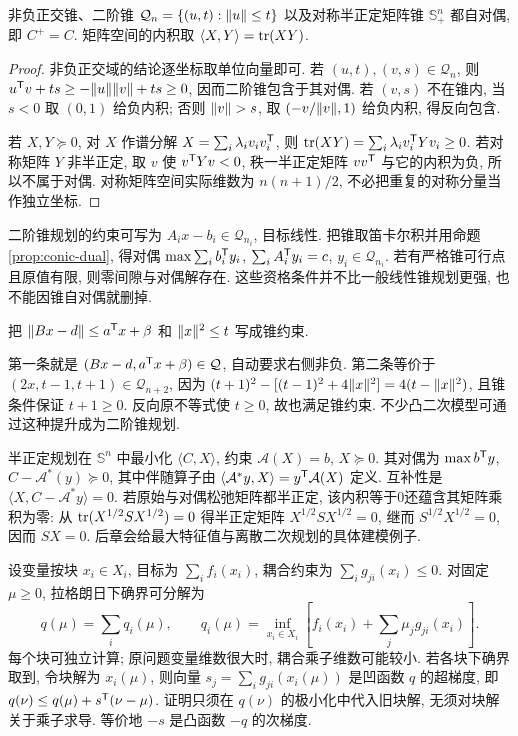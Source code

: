 \begin{proposition}
非负正交锥、二阶锥 $\mathcal Q_n=\{(u,t):\lVert u\rVert\le t\}$ 以及对称半正定矩阵锥 $\mathbb S_+^n$ 都自对偶, 即 $C^+=C$. 矩阵空间的内积取 $\langle X,Y\rangle=\operatorname{tr}(XY)$.
\end{proposition}
\begin{proof}
非负正交域的结论逐坐标取单位向量即可. 若 $(u,t),(v,s)\in\mathcal Q_n$, 则 $u^{\mathsf T} v+ts\ge-\lVert u\rVert\lVert v\rVert+ts\ge0$, 因而二阶锥包含于其对偶. 若 $(v,s)$ 不在锥内, 当 $s<0$ 取 $(0,1)$ 给负内积; 否则 $\lVert v\rVert>s$, 取 $(-v/\lVert v\rVert,1)$ 给负内积, 得反向包含.

若 $X,Y\succeq0$, 对 $X$ 作谱分解 $X=\sum_i\lambda_i v_iv_i^{\mathsf T}$, 则 $\operatorname{tr}(XY)=\sum_i\lambda_i v_i^{\mathsf T} Yv_i\ge0$. 若对称矩阵 $Y$ 非半正定, 取 $v$ 使 $v^{\mathsf T} Yv<0$, 秩一半正定矩阵 $vv^{\mathsf T}$ 与它的内积为负, 所以不属于对偶. 对称矩阵空间实际维数为 $n(n+1)/2$, 不必把重复的对称分量当作独立坐标.
\end{proof}
二阶锥规划的约束可写为 $A_ix-b_i\in\mathcal Q_{n_i}$, 目标线性. 把锥取笛卡尔积并用命题\ref{prop:conic-dual}, 得对偶 $\max\sum_i b_i^{\mathsf T} y_i$, $\sum_iA_i^{\mathsf T} y_i=c$, $y_i\in\mathcal Q_{n_i}$. 若有严格锥可行点且原值有限, 则零间隙与对偶解存在. 这些资格条件并不比一般线性锥规划更强, 也不能因锥自对偶就删掉.

\begin{example}
把 $\lVert Bx-d\rVert\le a^{\mathsf T} x+\beta$ 和 $\lVert x\rVert^2\le t$ 写成锥约束.
\end{example}
\begin{solution}
第一条就是 $(Bx-d,a^{\mathsf T} x+\beta)\in\mathcal Q$, 自动要求右侧非负. 第二条等价于 $(2x,t-1,t+1)\in\mathcal Q_{n+2}$, 因为 $(t+1)^2-[(t-1)^2+4\lVert x\rVert^2]=4(t-\lVert x\rVert^2)$, 且锥条件保证 $t+1\ge0$. 反向原不等式使 $t\ge0$, 故也满足锥约束. 不少凸二次模型可通过这种提升成为二阶锥规划.
\end{solution}
半正定规划在 $\mathbb S^n$ 中最小化 $\langle C,X\rangle$, 约束 $\mathcal A(X)=b$, $X\succeq0$. 其对偶为 $\max b^{\mathsf T} y$, $C-\mathcal A^*(y)\succeq0$, 其中伴随算子由 $\langle\mathcal A^*y,X\rangle=y^{\mathsf T}\mathcal A(X)$ 定义. 互补性是 $\langle X,C-\mathcal A^*y\rangle=0$. 若原始与对偶松弛矩阵都半正定, 该内积等于0还蕴含其矩阵乘积为零: 从 $\operatorname{tr}(X^{1/2}SX^{1/2})=0$ 得半正定矩阵 $X^{1/2}SX^{1/2}=0$, 继而 $S^{1/2}X^{1/2}=0$, 因而 $SX=0$. 后章会给最大特征值与离散二次规划的具体建模例子.

设变量按块 $x_i\in X_i$, 目标为 $\sum_i f_i(x_i)$, 耦合约束为 $\sum_i g_{ji}(x_i)\le0$. 对固定 $\mu\ge0$, 拉格朗日下确界可分解为
\[
q(\mu)=\sum_iq_i(\mu),\qquad
q_i(\mu)=\inf_{x_i\in X_i}\left[f_i(x_i)+\sum_j\mu_jg_{ji}(x_i)\right].
\]
每个块可独立计算; 原问题变量维数很大时, 耦合乘子维数可能较小. 若各块下确界取到, 令块解为 $x_i(\mu)$, 则向量 $s_j=\sum_i g_{ji}(x_i(\mu))$ 是凹函数 $q$ 的超梯度, 即 $q(\nu)\le q(\mu)+s^{\mathsf T}(\nu-\mu)$. 证明只须在 $q(\nu)$ 的极小化中代入旧块解, 无须对块解关于乘子求导. 等价地 $-s$ 是凸函数 $-q$ 的次梯度.

